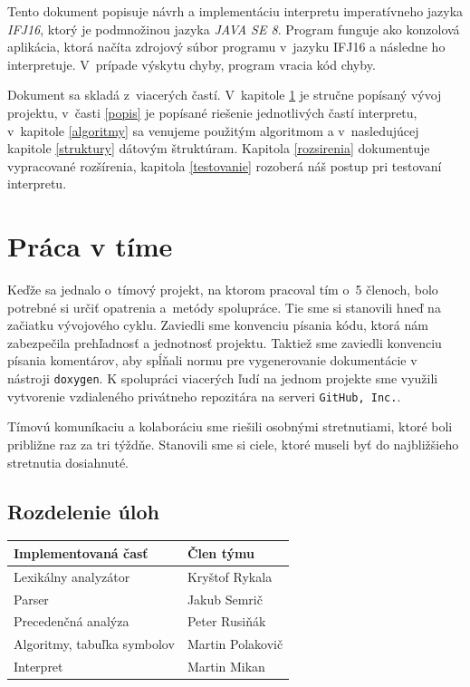 \documentclass[11pt,a4paper]{article}
\begin{document}
	Tento dokument popisuje návrh a implementáciu interpretu imperatívneho jazyka \emph{IFJ16}, ktorý je podmnožinou jazyka \emph{JAVA SE 8}.
	Program funguje ako konzolová aplikácia, ktorá načíta zdrojový súbor programu v~jazyku IFJ16 a následne ho interpretuje. V~prípade výskytu chyby, program vracia kód chyby.
	
	Dokument sa skladá z~viacerých častí. V~kapitole \ref{tim} je stručne popísaný vývoj projektu, v~časti \ref{popis} je popísané riešenie jednotlivých častí interpretu, v~kapitole \ref{algoritmy} sa venujeme použitým algoritmom a v~nasledujúcej kapitole \ref{struktury} dátovým štruktúram. Kapitola \ref{rozsirenia} dokumentuje vypracované rozšírenia, kapitola \ref{testovanie} rozoberá náš postup pri testovaní interpretu.
	
	
	\section{Práca v tíme}
	\label{tim}
	
	Keďže sa jednalo o~tímový projekt, na ktorom pracoval tím o~5 členoch, bolo potrebné si určiť opatrenia a~metódy spolupráce. Tie sme si stanovili hneď na začiatku vývojového cyklu. Zaviedli sme konvenciu písania kódu, ktorá nám zabezpečila prehľadnosť a jednotnosť projektu. Taktiež sme zaviedli konvenciu písania komentárov, aby spĺňali normu pre vygenerovanie dokumentácie v nástroji \texttt{doxygen}. K spolupráci viacerých ľudí na jednom projekte sme využili vytvorenie vzdialeného privátneho repozitára na serveri \texttt{GitHub, Inc.}.
	
	Tímovú komuníkaciu a kolaboráciu sme riešili osobnými stretnutiami, ktoré boli približne raz za tri týždňe. Stanovili sme si ciele, ktoré museli byť do najbližšieho stretnutia dosiahnuté.
	
	\subsection{Rozdelenie úloh}
	\begin{center}
		\begin{tabular}{|l|l|}
			\hline
			\large{\textbf{Implementovaná časť}} & \large{\textbf{Člen týmu}}\\
			\hline
			\hline
			Lexikálny analyzátor & Kryštof Rykala \\
			\hline
			Parser & Jakub Semrič \\
			\hline
			Precedenčná analýza & Peter Rusiňák \\
			\hline
			Algoritmy, tabuľka symbolov & Martin Polakovič \\
			\hline
			Interpret & Martin Mikan \\
			\hline
		\end{tabular}
	\end{center}
	
\end{document}
